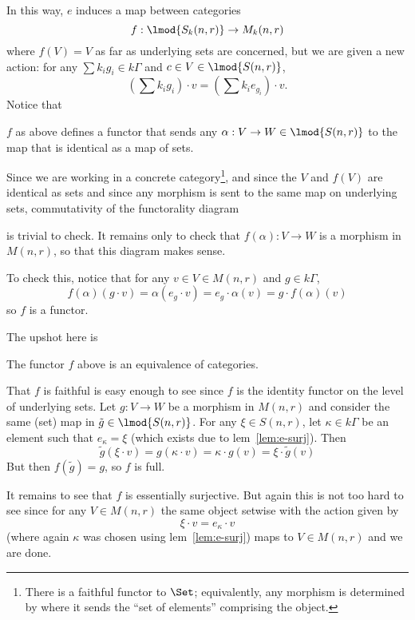 \documentclass[12pt]{article}
\begin{document}
In this way, $e$ induces a map between categories
\[f:\lmod{S_k(n,r)}\to M_k(n,r)\]
where $f(V)=V$ as far as underlying sets are concerned, but we are given a new action: 
for any $\sum k_i g_i\in k\Gamma$ and $c\in V\in \lmod{S(n,r)}$,
\[\left(\sum k_i g_i\right)\cdot v=\left(\sum k_i e_{g_i}\right)\cdot v.\]
Notice that 
\begin{lem}
	$f$ as above defines a functor that sends any $\alpha:V\to W\in \lmod{S(n,r)}$
	to the map that is identical as a map of sets. 
\end{lem}
\begin{prf}
	Since we are working in a concrete category\footnote{There is a faithful functor to $\Set$; equivalently, any morphism is determined by where it sends the ``set of elements'' comprising the object.}, 
	and since the $V$ and $f(V)$ are identical as sets and since any morphism is sent to the same map on underlying sets, commutativity of 
	the functorality diagram 
	\begin{center}
	\end{center}
	is trivial to check. It remains only to check that $f(\alpha):V\to W$ is a morphism in $M(n,r)$, so that this diagram makes sense.

	To check this, notice that for any $v\in V\in M(n,r)$ and $g\in k\Gamma$,
	\[f(\alpha)(g\cdot v)=\alpha(e_g\cdot v)=e_g\cdot \alpha(v)=g\cdot f(\alpha)(v)\]
	so $f$ is a functor.
\end{prf}
The upshot here is 
\begin{thm}
	The functor $f$ above is an equivalence of categories.
\end{thm}
\begin{prf}
	That $f$ is faithful is easy enough to see since $f$ is the identity functor on the level of underlying sets. Let $g:V\to W$ be a morphism in 
	$M(n,r)$ and consider the same (set) map in $\tilde g\in\lmod{S(n,r)}$. For any $\xi\in S(n,r)$, let $\kappa\in k\Gamma$ be an element such that $e_\kappa=\xi$
	(which exists due to lem~\ref{lem:e-surj}).
	Then 
	\[\tilde g(\xi\cdot v)=g(\kappa\cdot v)=\kappa\cdot g(v)=\xi\cdot \tilde g(v)\]
	But then $f(\tilde g)=g$, so $f$ is full.

	It remains to see that $f$ is essentially surjective. But again this is not too hard to see since for any $V\in M(n,r)$ the same object setwise with the action given by 
	\[\xi\cdot v=e_\kappa\cdot v\]
	(where again $\kappa$ was chosen using lem~\ref{lem:e-surj}) maps to $V\in M(n,r)$ and we are done.
\end{prf}
\end{document}
